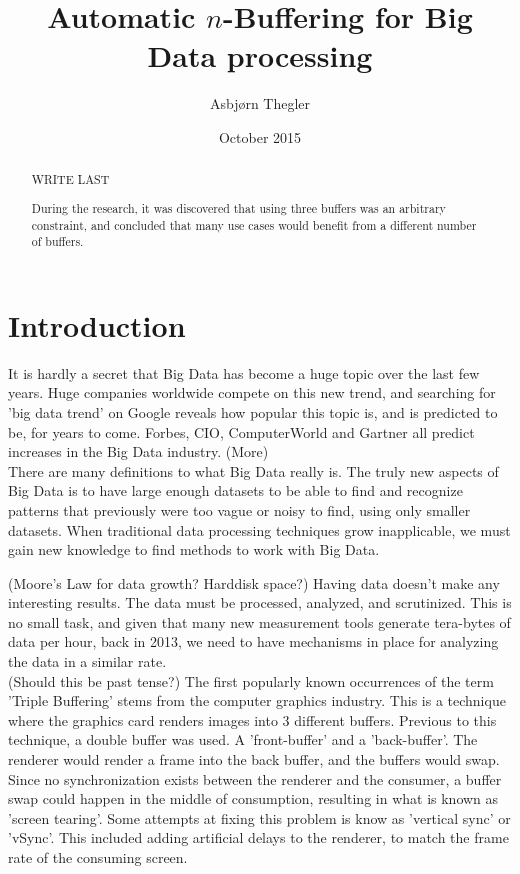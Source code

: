 \documentclass[a4paper]{article}
\title{Automatic $n$-Buffering for Big Data processing}
\author{Asbj\o rn Thegler}
\date{October 2015}
\begin{document}
\maketitle

\sloppy

\begin{abstract}
WRITE LAST

During the research, it was discovered that using three buffers was an arbitrary constraint, and
concluded that many use cases would benefit from a different number of buffers.
\end{abstract}

\newpage
\tableofcontents





\newpage
\section{Introduction}
It is hardly a secret that Big Data has become a huge topic over the last few years. Huge companies worldwide
compete on this new trend, and searching for 'big data trend' on Google reveals how popular this topic is, and is predicted to
be, for years to come. Forbes, CIO, ComputerWorld and Gartner all predict increases in the Big Data industry. (More)\\

There are many definitions to what Big Data really is. The truly new aspects of Big Data is to have large enough datasets to be able to find
and recognize patterns that previously were too vague or noisy to find, using only smaller datasets. When traditional data
processing techniques grow inapplicable, we must gain new knowledge to find methods to work with Big Data.

(Moore's Law for data growth? Harddisk space?)
Having data doesn't make any interesting results. The data must be processed, analyzed, and scrutinized. This is no small
task, and given that many new measurement tools generate tera-bytes of data per hour, back in 2013, we need to have mechanisms
in place for analyzing the data in a similar rate.\\


(Should this be past tense?)
The first popularly known occurrences of the term 'Triple Buffering' stems from the computer graphics industry.
This is a technique where the graphics card renders images into 3 different buffers. Previous to this technique, a double buffer
was used. A 'front-buffer' and a 'back-buffer'. The renderer would render a frame into the back buffer, and the buffers would swap. Since no
synchronization exists between the renderer and the consumer, a buffer swap could happen in the middle of consumption,
resulting in what is known as 'screen tearing'. Some attempts at fixing this problem is know as 'vertical sync' or 'vSync'.
This included adding artificial delays to the renderer, to match the frame rate of the consuming screen.
\end{document}

